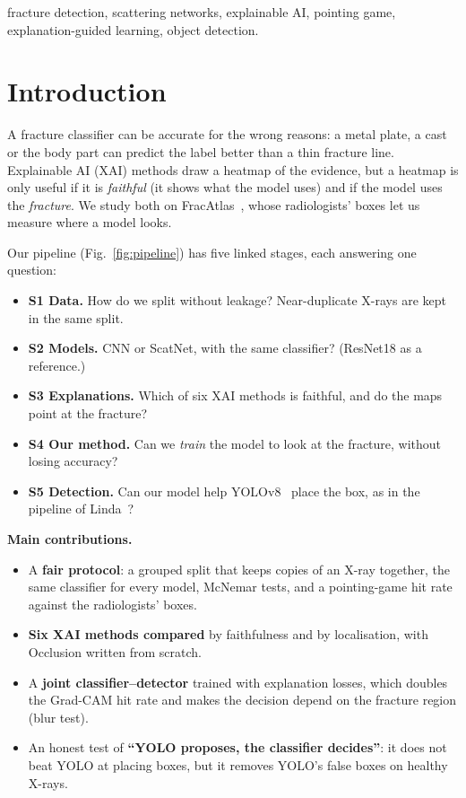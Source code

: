 \documentclass[conference]{IEEEtran}
\begin{document}
\begin{IEEEkeywords}
fracture detection, scattering networks, explainable AI, pointing game, explanation-guided learning, object detection.
\end{IEEEkeywords}

\section{Introduction}
A fracture classifier can be accurate for the wrong reasons: a metal plate, a cast or the body part can predict the
label better than a thin fracture line. Explainable AI (XAI) methods draw a heatmap of the evidence, but a heatmap is
only useful if it is \emph{faithful} (it shows what the model uses) and if the model uses the \emph{fracture}. We study
both on FracAtlas~\cite{abedeen2023fracatlas}, whose radiologists' boxes let us measure where a model looks.

Our pipeline (Fig.~\ref{fig:pipeline}) has five linked stages, each answering one question:
\begin{itemize}
\item \textbf{S1 Data.} How do we split without leakage? Near-duplicate X-rays are kept in the same split.
\item \textbf{S2 Models.} CNN or ScatNet, with the same classifier? (ResNet18 as a reference.)
\item \textbf{S3 Explanations.} Which of six XAI methods is faithful, and do the maps point at the fracture?
\item \textbf{S4 Our method.} Can we \emph{train} the model to look at the fracture, without losing accuracy?
\item \textbf{S5 Detection.} Can our model help YOLOv8~\cite{jocher2023yolov8} place the box, as in the pipeline of
Linda~\cite{linda2025}?
\end{itemize}

\textbf{Main contributions.}
\begin{itemize}
\item A \textbf{fair protocol}: a grouped split that keeps copies of an X-ray together, the same classifier for every
model, McNemar tests, and a pointing-game hit rate against the radiologists' boxes.
\item \textbf{Six XAI methods compared} by faithfulness and by localisation, with Occlusion written from scratch.
\item A \textbf{joint classifier--detector} trained with explanation losses, which doubles the Grad-CAM hit rate and
makes the decision depend on the fracture region (blur test).
\item An honest test of \textbf{``YOLO proposes, the classifier decides''}: it does not beat YOLO at placing boxes,
but it removes YOLO's false boxes on healthy X-rays.
\end{itemize}
\end{document}
